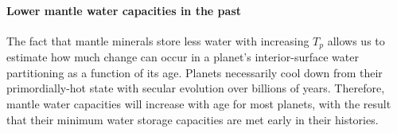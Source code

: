 

\paragraph{Lower mantle water capacities in the past}

The fact that mantle minerals store less water with increasing $T_p$ allows us to estimate how much change can occur in a planet's interior-surface water partitioning as a function of its age. Planets necessarily cool down from their primordially-hot state with secular evolution over billions of years. Therefore, mantle water capacities will increase with age for most planets, with the result that their minimum water storage capacities are met early in their histories.


